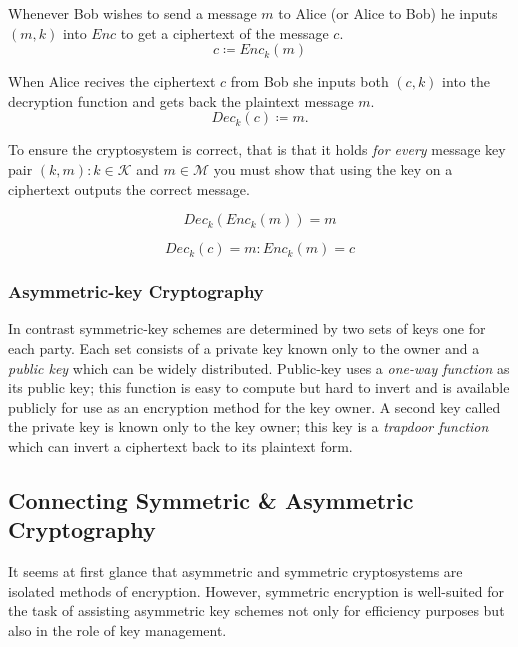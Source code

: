 Whenever Bob wishes to send a message $m$ to Alice (or Alice to Bob) he inputs $(m,k)$ into $Enc$ to get a ciphertext of the message $c$.
\[c \coloneqq Enc_{k}(m)\]

When Alice recives the ciphertext $c$ from Bob she inputs both $(c,k)$ into the decryption function and gets back the plaintext message $m$.
\[Dec_{k}(c) \coloneqq m.\]

To ensure the cryptosystem is correct, that is that it holds \textit{for every} message key pair $(k,m) : k \in \mathcal{K}$ and $m \in \mathcal{M}$ you must show that using the key on a ciphertext outputs the correct message.

\[Dec_{k}(Enc_{k}(m)) = m\]

\[Dec_{k}(c) = m : Enc_{k}(m) = c\]



\subsubsection{Asymmetric-key Cryptography}
In contrast symmetric-key schemes are determined by two sets of keys one for each party. Each set consists of a private key known only to the owner and a \emph{public key} which can be widely distributed.
Public-key uses a \emph{one-way function} as its public key; this function is easy to compute but hard to invert and is available publicly for use as an encryption method for the key owner. A second key called the private key is known only to the key owner; this key is a \emph{trapdoor function} which can invert a ciphertext back to its plaintext form.

 
\subsection{Connecting Symmetric \& Asymmetric Cryptography}
It seems at first glance that asymmetric and symmetric cryptosystems are isolated methods of encryption. However, symmetric encryption is well-suited for the task of assisting asymmetric key schemes not only for efficiency purposes but also in the role of key management.
